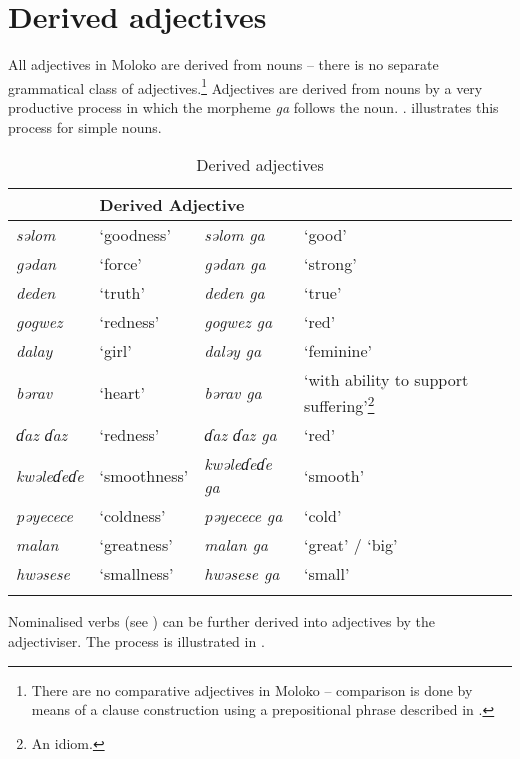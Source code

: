 \section{Derived adjectives}\label{sec:5.3} 
\hypertarget{RefHeading1211661525720847}{}
All adjectives in Moloko are derived from nouns -- there is no separate grammatical class of adjectives.\footnote{There are no comparative adjectives in Moloko -- comparison is done by means of a clause construction using a prepositional phrase described in .} Adjectives are derived from nouns by a very productive process in which the morpheme \textit{ga}  follows the noun.  . illustrates this process for simple nouns. 

\begin{table}
\begin{tabular}{l@{ }ll@{ }l}
\lsptoprule
\multicolumn{2}{l}{Noun} & \multicolumn{2}{l}{Derived Adjective}\\\midrule
\textit{səlom} & ‘goodness’  & \textit{səlom ga} & ‘good’ \\
\textit{gədan} & ‘force’ & \textit{gədan ga} & ‘strong’\\
\textit{deden} & ‘truth’ & \textit{deden ga} & ‘true’\\
\textit{gogwez} & ‘redness’ & \textit{gogwez ga} & ‘red’ \\
\textit{dalay} & ‘girl’ & \textit{daləy ga} & ‘feminine’\\
\textit{bərav} & ‘heart’ & \textit{bərav ga} & ‘with ability to support suffering’\footnote{An idiom.} \\
\textit{ɗaz ɗaz} & ‘redness’ & \textit{ɗaz ɗaz ga} & ‘red’ \\
\textit{kwəleɗeɗe} & ‘smoothness’ & \textit{kwəleɗeɗe ga} & ‘smooth’\\
\textit{pəyecece} & ‘coldness’ & \textit{pəyecece ga} & ‘cold’\\
\textit{malan} & ‘greatness’   & \textit{malan ga} & ‘great’ / ‘big’\\
\textit{hwəsese} & ‘smallness’ & \textit{hwəsese ga} & ‘small’\\
\lspbottomrule
\end{tabular}
\caption{Derived adjectives}\label{tab:35}
\end{table}

Nominalised verbs (see ) can be further derived into adjectives by the adjectiviser. The process is illustrated in .

